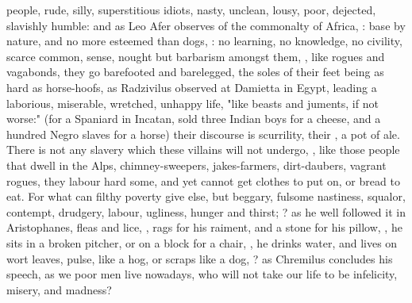 people, rude, silly, superstitious idiots, nasty, unclean, lousy, poor,
dejected, slavishly humble: and as Leo Afer observes of
the commonalty of Africa, : base by nature, and no
more esteemed than dogs, : no
learning, no knowledge, no civility, scarce common, sense, nought but barbarism
amongst them, ,
like rogues and vagabonds, they go barefooted and barelegged, the soles of
their feet being as hard as horse-hoofs, as Radzivilus
observed at Damietta in Egypt, leading a laborious, miserable, wretched,
unhappy life, "like beasts and juments, if not worse:"
(for a Spaniard in Incatan, sold three Indian boys for a
cheese, and a hundred Negro slaves for a horse) their discourse is scurrility,
their , a pot of ale. There is not any slavery which these
villains will not undergo, , \etc{} like those people that dwell in the
Alps, chimney-sweepers, jakes-farmers, dirt-daubers,
vagrant rogues, they labour hard some, and yet cannot get clothes to put on, or
bread to eat. For what can filthy poverty give else, but
beggary, fulsome nastiness, squalor, contempt, drudgery,
labour, ugliness, hunger and thirst; ? as
he well followed it in Aristophanes, fleas and lice,
,
rags for his raiment, and a stone for his pillow, , he sits in a broken pitcher, or on a block for a chair, , he drinks water, and lives on wort leaves,
pulse, like a hog, or scraps like a dog, ? as Chremilus concludes his
speech, as we poor men live nowadays, who will not take our life to be
infelicity, misery, and madness?

